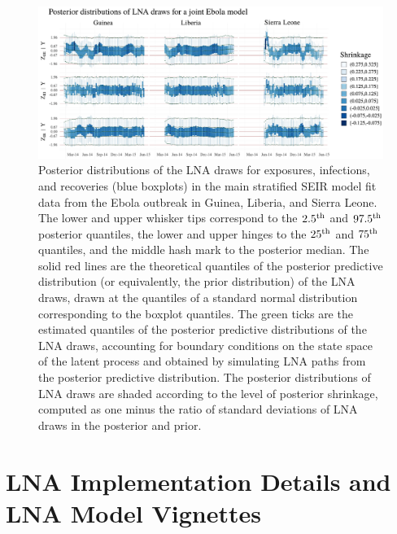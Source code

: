 \begin{figure}[htbp]
	\begin{fullpage}
		\centering
		\includegraphics[width=\linewidth]{figures/ebola_joint_drawplots}
		\caption[Posterior distributions of LNA draws for the main stratified SEIR model fit to data from the West Africa Ebola outbreak.]{Posterior distributions of the LNA draws for exposures, infections, and recoveries (blue boxplots) in the main stratified SEIR model fit data from the Ebola outbreak in Guinea, Liberia, and Sierra Leone. The lower and upper whisker tips correspond to the $ 2.5^{\mathrm{th}} $ and $ 97.5^{\mathrm{th}} $ posterior quantiles, the lower and upper hinges to the $ 25^{\mathrm{th}} $ and $ 75^{\mathrm{th}} $ quantiles, and the middle hash mark to the posterior median. The solid red lines are the theoretical quantiles of the posterior predictive distribution (or equivalently, the prior distribution) of the LNA draws, drawn at the quantiles of a standard normal distribution corresponding to the boxplot quantiles. The green ticks are the estimated quantiles of the posterior predictive distributions of the LNA draws, accounting for boundary conditions on the state space of the latent process and obtained by simulating LNA paths from the posterior predictive distribution. The posterior distributions of LNA draws are shaded according to the level of posterior shrinkage, computed as one minus the ratio of standard deviations of LNA draws in the posterior and prior.}
		\label{fig:ebola_joint_drawplots}
	\end{fullpage}
\end{figure}

\newpage
\section{LNA Implementation Details and LNA Model Vignettes}
\label{sec:lna_implementation_vignettes}